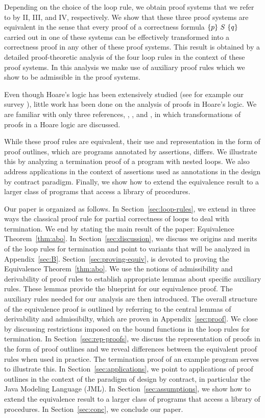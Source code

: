 \documentclass[manuscript, screen, review]{acmart}
\begin{document}
Depending on the choice of the loop rule, we obtain proof systems that
we refer to by II, III, and IV, respectively.  We show that these
three proof systems are equivalent in the sense that every proof of a
correctness formula $\mbox{$\{{p}\}\ {S}\ \{{q}\}$}$ carried out in one of these systems
can be effectively transformed into a correctness proof in any other
of these proof systems.  This result is obtained by a detailed
proof-theoretic analysis of the four loop rules in the context of
these proof systems. In this analysis we make use of
auxiliary proof rules which we show to be admissible in the proof systems.

Even though Hoare's logic has been extensively studied (see for
example our survey \cite{AO19}), little work has been done on the
analysis of proofs in Hoare's logic. We are familiar with only three
references, \cite{Apt81a}, \cite{GR16}, and \cite{Tiu02}, in which
transformations of proofs in a Hoare logic are discussed.

While these proof rules are equivalent, their use and representation
in the form of proof outlines, which are programs annotated by
assertions, differs. We illustrate this by analyzing a termination
proof of a program with nested loops. We also address applications in
the context of assertions used as annotations in the design by
contract paradigm.
Finally, we show how to extend the equivalence result to a larger class 
of programs that access a library of procedures.

Our paper is organized as follows.
In Section~\ref{sec:loop-rules}, we extend in three ways the classical proof rule 
for partial correctness of loops to deal with termination.
We end by stating the main result of the paper: Equivalence Theorem~\ref{thm:abo}.
In Section~\ref{sec:discussion}, we discuss we origins and merits 
of the loop rules for termination and point to variants that will be analyzed in Appendix~\ref{sec:B}.
Section~\ref{sec:proving-equiv}, is devoted to proving the Equivalence Theorem~\ref{thm:abo}. 
We use the notions of admissibility
and derivability of proof rules to establish appropriate lemmas about
specific auxiliary rules.
These lemmas provide the blueprint for our equivalence proof.
The auxiliary rules needed for our analysis are then introduced. 
The overall structure of the equivalence
proof is outlined by referring to the central lemmas of 
derivability and admissibilty, which are proven in Appendix~\ref{sec:proof}.
We close by discussing restrictions imposed on the bound functions
in the loop rules for termination.
In Section~\ref{sec:rep-proofs}, we discuss the representation of proofs
in the form of proof outlines and we reveal differences between the
equivalent proof rules when used in practice.
The termination proof of an example program serves to illustrate this.
In Section~\ref{sec:applications}, we point to applications of proof outlines
in the context of the paradigm of design by contract,
in particular the Java Modeling Language (JML).
In Section~\ref{sec:assumptions}, we show how to extend the equivalence result 
to a larger class of programs that access a library of procedures.
In Section~\ref{sec:conc}, we conclude our paper.
\end{document}
